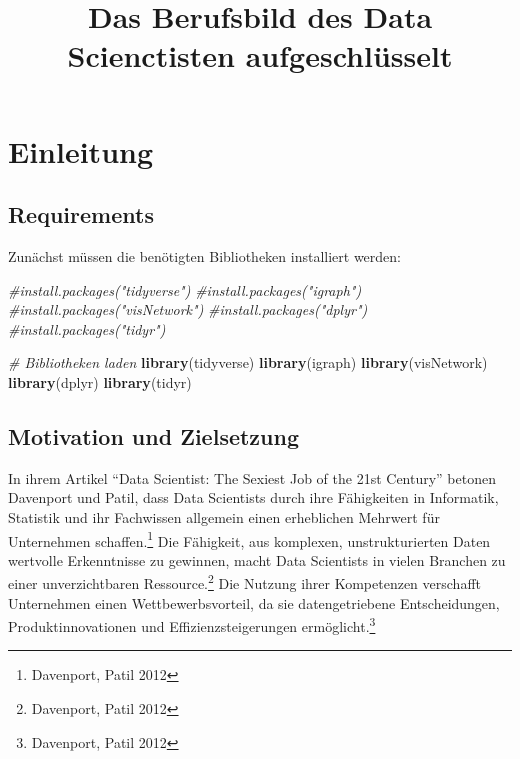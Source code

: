 \documentclass[
]{article}
\title{Das Berufsbild des Data Scienctisten aufgeschlüsselt}
\author{}
\date{\vspace{-2.5em}}
\newenvironment{Shaded}{\begin{snugshade}}{\end{snugshade}}
\newcommand{\CommentTok}[1]{\textcolor[rgb]{0.56,0.35,0.01}{\textit{#1}}}
\newcommand{\FunctionTok}[1]{\textcolor[rgb]{0.13,0.29,0.53}{\textbf{#1}}}
\newcommand{\NormalTok}[1]{#1}
\begin{document}
\maketitle

{
\setcounter{tocdepth}{3}
\tableofcontents
}
\section{Einleitung}\label{einleitung}

\subsection{Requirements}\label{requirements}

Zunächst müssen die benötigten Bibliotheken installiert werden:

\begin{Shaded}
\begin{Highlighting}[]
\CommentTok{\#install.packages("tidyverse")}
\CommentTok{\#install.packages("igraph")}
\CommentTok{\#install.packages("visNetwork")}
\CommentTok{\#install.packages("dplyr")}
\CommentTok{\#install.packages("tidyr")}
\end{Highlighting}
\end{Shaded}

\begin{Shaded}
\begin{Highlighting}[]
\CommentTok{\# Bibliotheken laden}
\FunctionTok{library}\NormalTok{(tidyverse)}
\FunctionTok{library}\NormalTok{(igraph)}
\FunctionTok{library}\NormalTok{(visNetwork)}
\FunctionTok{library}\NormalTok{(dplyr)}
\FunctionTok{library}\NormalTok{(tidyr)}
\end{Highlighting}
\end{Shaded}

\subsection{Motivation und
Zielsetzung}\label{motivation-und-zielsetzung}

In ihrem Artikel ``Data Scientist: The Sexiest Job of the 21st Century''
betonen Davenport und Patil, dass Data Scientists durch ihre Fähigkeiten
in Informatik, Statistik und ihr Fachwissen allgemein einen erheblichen
Mehrwert für Unternehmen schaffen.\footnote{Davenport, Patil 2012} Die
Fähigkeit, aus komplexen, unstrukturierten Daten wertvolle Erkenntnisse
zu gewinnen, macht Data Scientists in vielen Branchen zu einer
unverzichtbaren Ressource.\footnote{Davenport, Patil 2012} Die Nutzung
ihrer Kompetenzen verschafft Unternehmen einen Wettbewerbsvorteil, da
sie datengetriebene Entscheidungen, Produktinnovationen und
Effizienzsteigerungen ermöglicht.\footnote{Davenport, Patil 2012}
\end{document}
